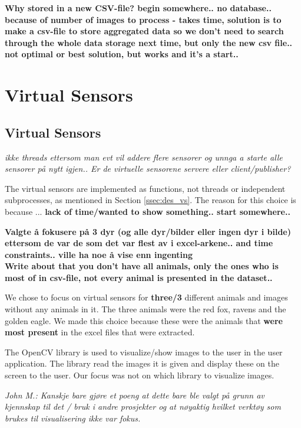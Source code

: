 \documentclass[USenglish]{uit-thesis}
\begin{document}
\textbf{Why stored in a new CSV-file? begin somewhere.. no database.. because of number of images to process - takes time, solution is to make a csv-file to store aggregated data so we don't need to search through the whole data storage next time, but only the new csv file.. not optimal or best solution, but works and it's a start..}


\section{Virtual Sensors} \label{sec:imp_virsens}
\subsection{Virtual Sensors} %
\textit{ikke threads ettersom man evt vil addere flere sensorer og unnga a starte alle sensorer på nytt igjen..
Er de virtuelle sensorene servere eller client/publisher?}

The virtual sensors are implemented as functions, not threads or independent subprocesses, as mentioned in Section \ref{ssec:des_vs}. The reason for this choice is because ... \textbf{lack of time/wanted to show something.. start somewhere..}

\textbf{Valgte å fokusere på 3 dyr (og alle dyr/bilder eller ingen dyr i bilde) ettersom de var de som det var flest av i excel-arkene.. and time constraints.. ville ha noe å vise enn ingenting} \\
\textbf{Write about that you don't have all animals, only the ones who is most of in csv-file, not every animal is presented in the dataset..}

We chose to focus on virtual sensors for \textbf{three/3} different animals and images without any animals in it. The three animals were the red fox, ravens and the golden eagle. We made this choice because these were the animals that \textbf{were most present} in the excel files that were extracted.




The OpenCV library is used to visualize/show images to the user in the user application. The library read the images it is given and display these on the screen to the user. Our focus was not on which library to visualize images.

\textit{John M.: Kanskje bare gjøre et poeng at dette bare ble valgt på grunn av kjennskap til det / bruk i andre prosjekter og at nøyaktig hvilket verktøy som brukes til visualisering ikke var fokus.}
\end{document}
